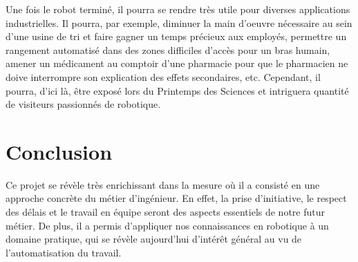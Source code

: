 \documentclass[a4paper,11pt]{article}
\begin{document}
Une fois le robot terminé, il pourra se rendre très utile pour diverses applications industrielles. Il pourra, par exemple, diminuer la main d'oeuvre nécessaire au sein d'une usine de tri et faire gagner un temps précieux aux employés, permettre un rangement automatisé dans des zones difficiles d'accès pour un bras humain, amener un médicament au comptoir d'une pharmacie pour que le pharmacien ne doive interrompre son explication des effets secondaires, etc. Cependant, il pourra, d'ici là, être exposé lors du Printemps des Sciences et intriguera quantité de visiteurs passionnés de robotique.

\section{Conclusion}
Ce projet se révèle très enrichissant dans la mesure où il a consisté en une approche concrète du métier d’ingénieur. En effet, la prise d’initiative, le respect des délais et le travail en équipe seront des aspects essentiels de notre futur métier. De plus, il a permis d’appliquer nos connaissances en robotique à un domaine pratique, qui se révèle aujourd’hui d’intérêt général au vu de l'automatisation du travail.



\newpage
{}
\printbibliography
\end{document}
